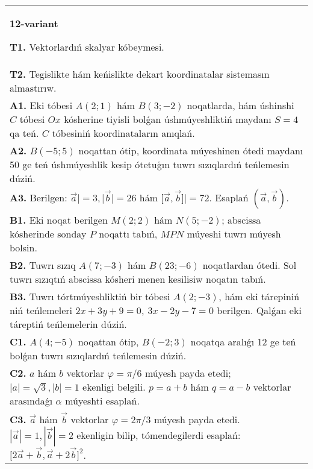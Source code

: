 \documentclass{article}
\begin{document}
\begin{tabular}{m{17cm}}
\textbf{12-variant}

\textbf{T1.} 
Vektorlardıń skalyar kóbeymesi.
 \\
\textbf{T2.} 
Tegislikte hám keńislikte dekart koordinatalar sistemasın almastırıw.
 \\
\textbf{A1.} 
Eki tóbesi $A (2;1) $ hám $B (3;-2) $ noqatlarda, hám
úshinshi $C$ tóbesi $Ox$ kósherine tiyisli bolǵan úshmúyeshliktiń
maydanı $S=4$ qa teń. $C$ tóbesiniń koordinataların anıqlań.
 \\
\textbf{A2.} 
$B (-5;5) $ noqattan ótip, koordinata múyeshinen ótedi
maydanı 50 ge teń úshmúyeshlik kesip ótetuģın tuwrı sızıqlardıń teńlemesin
dúziń.
 \\
\textbf{A3.} 
Berilgen: $\overrightarrow{a}| = 3,|\overrightarrow{b}| = 26$ hám
$\lbrack\overrightarrow{a},\overrightarrow{b}\rbrack| = 72$. Esaplań
$\left(\overrightarrow{a},\overrightarrow{b} \right) $.
 \\
\textbf{B1.} 
Eki noqat berilgen \(M (2;2) \) hám \(N (5;-2) \); abscissa kósherinde sonday $P$ noqattı tabıń, $MPN$ múyeshi tuwrı múyesh bolsin.
 \\
\textbf{B2.} 
Tuwrı sızıq \(A (7;-3) \) hám \(B (23;-6) \) noqatlardan ótedi.
Sol tuwrı sızıqtıń abscissa kósheri menen kesilisiw noqatın tabıń.
 \\
\textbf{B3.} 
Tuwrı tórtmúyeshliktiń bir tóbesi \(A (2;-3) \), hám eki tárepiniń
niń teńlemeleri \(2x+3y+9=0,\ 3x-2y-7=0\)
berilgen. Qalǵan eki táreptiń teńlemelerin dúziń.
 \\
\textbf{C1.} 
\(A (4;-5) \) noqattan ótip, \(B (-2;3) \) noqatqa
aralıǵı 12 ge teń bolǵan tuwrı sızıqlardıń teńlemesin dúziń.
 \\
\textbf{C2.} 
$a$ hám $b$ vektorlar $\varphi = \pi/6$ múyesh payda etedi; $|a| = \sqrt{3},|b| = 1$ ekenligi belgili. $p = a + b$ hám $q = a - b$ vektorlar arasındaǵı $\alpha$ múyeshti esaplań.
 \\
\textbf{C3.} 
$\vec{a}$ hám $\vec{b}$ vektorlar $\varphi = 2\pi/3$ múyesh payda etedi. $|\vec{a}| = 1,|\vec{b}| = 2$ ekenligin bilip, tómendegilerdi esaplań:
$\lbrack 2\overrightarrow{a} + \overrightarrow{b},\overrightarrow{a} + 2\overrightarrow{b}\rbrack^{2}$.
 \\

\end{tabular}
\vspace{1cm}
\end{document}
